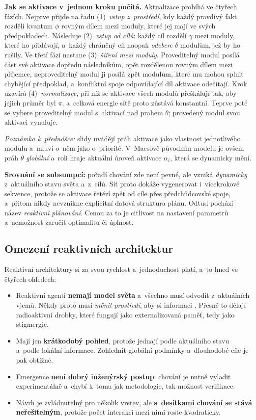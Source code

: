 \documentclass[11pt,a4paper]{article}
\theoremstyle{definition}
\begin{document}
\textbf{Jak se aktivace v~jednom kroku počítá.} Aktualizace probíhá ve čtyřech fázích.
Nejprve přijde na řadu (1)~\emph{vstup z~prostředí}, kdy každý pravdivý fakt rozdělí kvantum
$\phi$ rovným dílem mezi moduly, které jej mají ve svých předpokladech. Následuje
(2)~\emph{vstup od cílů}: každý cíl rozdělí $\gamma$ mezi moduly, které ho přidávají, a~každý
chráněný cíl naopak \emph{odebere} $\delta$ modulům, jež by ho rušily. Ve třetí fázi nastane
(3)~\emph{šíření mezi moduly}. Proveditelný modul posílá část své aktivace dopředu následníkům,
opět rozdělenou rovným dílem mezi příjemce, neproveditelný modul ji posílá zpět modulům, které
mu mohou splnit chybějící předpoklad, a~konfliktní spoje odpovídající díl aktivace odečítají.
Krok uzavírá (4)~\emph{normalizace}, při níž se aktivace všech modulů přeškálují tak, aby jejich
průměr byl $\pi$, a~celková energie sítě proto zůstává konstantní. Teprve poté se vybere
proveditelný modul s~aktivací nad prahem $\theta$; provedený modul svou aktivaci vynuluje.

\emph{Poznámka k~přednášce:} slidy uvádějí práh aktivace jako vlastnost jednotlivého modulu
a~mluví o~něm jako o~prioritě. V~Maesově původním modelu je ovšem práh $\theta$
\emph{globální} a~roli  hraje aktuální úroveň aktivace $\alpha_i$, která se
dynamicky mění.

\medskip\noindent
\textbf{Srovnání se subsumpcí:} pořadí chování zde není pevné, ale vzniká \emph{dynamicky}
z~aktuálního stavu světa a~z~cílů. Síť proto dokáže vygenerovat i~vícekrokové 
sekvence, protože se aktivace řetězí zpět od cíle přes předchůdcovské spoje, a~přitom nikdy
nevznikne explicitní datová struktura plánu. Odtud pochází název \emph{reaktivní plánování}.
Cenou za to je citlivost na nastavení parametrů a~nemožnost zaručit optimalitu či úplnost.

\subsection{Omezení reaktivních architektur}

Reaktivní architektury si za svou rychlost a~jednoduchost platí, a~to hned ve čtyřech ohledech:

\begin{itemize}
\item Reaktivní agenti \textbf{nemají model světa} a~všechno musí odvodit z~aktuálních vjemů.
  Někdy proto musí \emph{měnit prostředí}, aby si informaci . Přesně to dělají
  radioaktivní drobky, které fungují jako externalizovaná paměť, tedy jako stigmergie.
\item Mají jen \textbf{krátkodobý pohled}, protože jednají podle aktuálního stavu a~podle
  lokální informace. Zohlednit globální podmínky a~dlouhodobé cíle je pak obtížné.
\item Emergence \textbf{není dobrý inženýrský postup}: chování je nutné vyladit experimentálně
  a~chybí k~tomu jak metodologie, tak možnost verifikace.
\item Návrh je zvládnutelný pro několik vrstev, ale \textbf{s~desítkami chování se stává
  neřešitelným}, protože počet interakcí mezi nimi roste kvadraticky.
\end{itemize}
\end{document}
